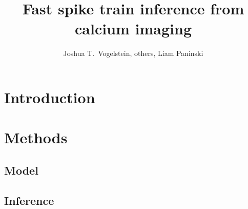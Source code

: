  
\newcommand{\zzz}{z}
\newcommand{\xT}{\ve{C}}
\newcommand{\yT}{\ve{y}}
\newcommand{\nT}{\ve{n}}
\newcommand{\zT}{\ve{n}}
\newcommand{\FT}{\ve{F}}
\newcommand{\lT}{\ve{\lam}}
\newcommand{\wX}{\widehat{\ve{C}}}
\newcommand{\wY}{\widehat{\ve{Y}}}
\newcommand{\CaT}{\Cav}
\newcommand{\ax}{\argmax_{\ve{C}_t \geq 0 \forall t}}
\newcommand{\an}{\argmin_{n_t \geq 0 \forall t}}
\newcommand{\az}{\argmin_{\bM \bC \geq \ve{0}}}
\newcommand{\ath}{\argmax_{\bth \in \ve{\Theta}}}
\newcommand{\ann}{\argmin_{n_t \in \mathbb{N}_0 \forall t}}
\newcommand{\hnm}{\widehat{\bn}}
\newcommand{\hCm}{\widehat{\bC}}
\newcommand{\transpo}[1]{{#1}^{\ensuremath{\mathsf{T}}}}           %
\newcommand\transp{{\!\scriptscriptstyle\mathrm T}}


\title{Fast spike train inference from calcium imaging}

\author{Joshua T.~Vogelstein, others, Liam Paninski}



\maketitle

\begin{abstract}
 

\end{abstract}

\section{Introduction}


\section{Methods} \label{sec:methods}

\subsection{Model}


\subsection{Inference} \label{sec:inf}


